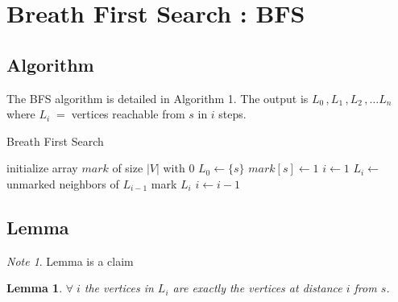 \documentclass{article}
\theoremstyle{definition}
\theoremstyle{remark}
\newtheorem{note}{Note}[section]
\theoremstyle{plain}
\newtheorem{lem}[thm]{Lemma}
\begin{document}
\section{Breath First Search : BFS}

\subsection{Algorithm}

The BFS algorithm is detailed in Algorithm 1.  The output is $L_0\,,L_1\,,L_2\,,\dots L_n$ where $L_i\;=\;$vertices reachable from $s$ in $i$ steps.

\begin{algorithm}
\caption{Breath First Search}\label{Breath first search for graph $G$}
\begin{algorithmic}[1]
	\State initialize array $mark$ of size $|V|$ with 0
	\State $L_0 \gets \{s\}$
	\State $mark[s] \gets 1$
	\State $i \gets 1$
	\Repeat
		\State $L_i \gets$ unmarked neighbors of $L_{i-1}$
		\State mark $L_i$ 
		\State $i \gets i-1$
\EndProcedure{}
\end{algorithmic}
\end{algorithm}

\subsection{Lemma}

\begin{note}
Lemma is a claim
\end{note}

\begin{lem}
$\forall\;i$ the vertices in $L_i$ are exactly the vertices at distance $i$ from $s$.
\end{lem}
\end{document}

